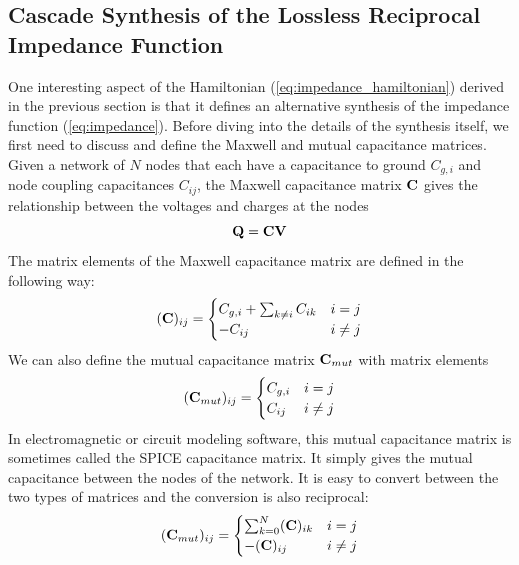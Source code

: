 \newpage
\subsection{Cascade Synthesis of the Lossless Reciprocal Impedance Function}\label{section:cascade_synthesis}
One interesting aspect of the Hamiltonian (\ref{eq:impedance_hamiltonian}) derived in the previous section is that it defines an alternative synthesis of the impedance function (\ref{eq:impedance}). Before diving into the details of the synthesis itself, we first need to discuss and define the Maxwell and mutual capacitance matrices. Given a network of $N$ nodes that each have a capacitance to ground $C_{g,i}$ and node coupling capacitances $C_{ij}$, the Maxwell capacitance matrix $\vb{C}$ gives the relationship between the voltages and charges at the nodes \cite{pos_cap, ruehli_cap}
\begin{equation}
    \vb{Q} = \vb{C} \vb{V}
\end{equation}
The matrix elements of the Maxwell capacitance matrix are defined in the following way:
\begin{equation}
    (\vb{C})_{ij} = \begin{cases}
    C_{g,i} + \sum_{k \neq i} C_{ik} & i = j\\
    -C_{ij} & i \neq j
    \end{cases}
\end{equation}
We can also define the mutual capacitance matrix $\vb{C}_{mut}$ with matrix elements
\begin{equation}
    (\vb{C}_{mut})_{ij} = \begin{cases}
        C_{g,i} & i=j\\
        C_{ij} & i \neq j
    \end{cases}
\end{equation}
In electromagnetic or circuit modeling software, this mutual capacitance matrix is sometimes called the SPICE capacitance matrix. It simply gives the mutual capacitance between the nodes of the network. It is easy to convert between the two types of matrices and the conversion is also reciprocal:
\begin{equation}
    (\vb{C}_{mut})_{ij} = \begin{cases}
        \sum_{k=0}^N(\vb{C})_{ik} & i=j \\
        -(\vb{C})_{ij} & i \neq j
    \end{cases}
\end{equation}
